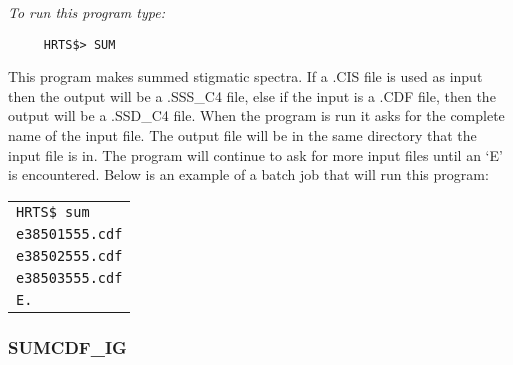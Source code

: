 {\em To run this program type:}
\begin{verbatim}
     HRTS$> SUM
\end{verbatim}
      This program makes summed stigmatic spectra. If a .CIS file is used
   as input then the output will be a .SSS\_C4 file, else if the input is a
   .CDF file, then the output will be a .SSD\_C4 file.
      When the program is run it asks for the complete name of the input
   file. The output file will be in the same directory that the input file
   is in. The program will continue to ask for more input files until an
   `E' is encountered.
      Below is an example of a batch job that will run this program:
\begin{center}
\begin{tabular}{||l||}
\hline

                    {\tt HRTS\$  sum} \\
                    {\tt e38501555.cdf} \\
                    {\tt e38502555.cdf} \\
                    {\tt e38503555.cdf} \\
                    {\tt E.} \\
\hline
\end{tabular}
\end{center}

\subsubsection{SUMCDF\_IG}

